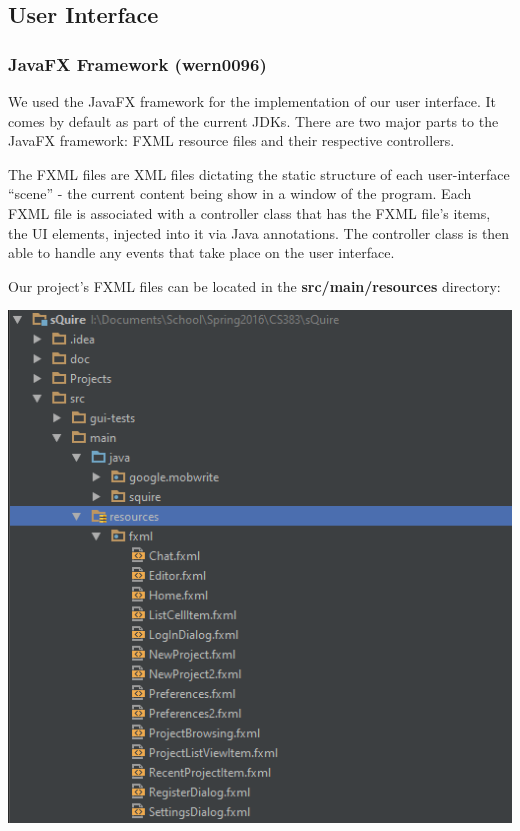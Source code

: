 \documentclass[twoside,letterpaper]{article}
\begin{document}
\subsection{User Interface}

\subsubsection{JavaFX Framework (wern0096)}

We used the JavaFX framework for the implementation of our user interface. It comes by default as part of the current JDKs. There are two major parts to the JavaFX framework: FXML resource files and their respective controllers.


The FXML files are XML files dictating the static structure of each user-interface ``scene'' - the current content being show in a window of the program. Each FXML file is associated with a controller class that has the FXML file's items, the UI elements, injected into it via Java annotations. The controller class is then able to handle any events that take place on the user interface. 

Our project's FXML files can be located in the \textbf{src/main/resources} directory: \bigskip

\begin{center}
\includegraphics[scale=0.85]{images/Implementation/Resources.png}
\end{center}
\end{document}

